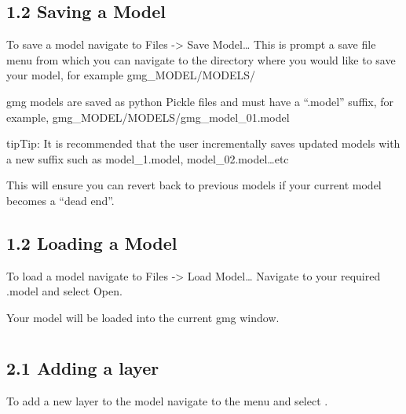\documentclass[a4paper,12pt,english]{sphinxmanual}
\begin{document}
\subsection{1.2 Saving a Model}
\label{\detokenize{manual__models:saving-a-model}}
To save a model navigate to Files -\textgreater{} Save Model…
This is prompt a save file menu from which you can navigate to the directory where you would like to save your model,
for example gmg\_MODEL/MODELS/

gmg models are saved as python Pickle files and must have a “.model” suffix, for example,
gmg\_MODEL/MODELS/gmg\_model\_01.model

\begin{sphinxadmonition}{tip}{Tip:}
It is recommended that the user incrementally saves updated models with a new suffix such as model\_1.model,
model\_02.model…etc
\end{sphinxadmonition}

This will ensure you can revert back to previous models if your current model becomes a “dead end”.

\begin{DUlineblock}{0em}
\item[] 
\end{DUlineblock}


\subsection{1.2 Loading a Model}
\label{\detokenize{manual__models:loading-a-model}}
To load a model navigate to Files -\textgreater{} Load Model…
Navigate to your required .model and select Open.

Your model will be loaded into the current gmg window.


\section{}
\label{\detokenize{manual__layer_nodes:model-layers}}\label{\detokenize{manual__layer_nodes::doc}}
\begin{DUlineblock}{0em}
\item[] 
\end{DUlineblock}


\subsection{2.1 Adding a layer}
\label{\detokenize{manual__layer_nodes:adding-a-layer}}
To add a new layer to the model navigate to the  menu and select .
\end{document}

